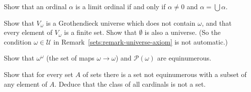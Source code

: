 \begin{exercise}\label{sets:exercise-limit-ordinal}
Show that an ordinal $\alpha$ is a limit ordinal if and only if
$\alpha \neq 0$ and $\alpha = \bigcup \alpha$.
\end{exercise}

\begin{exercise}\label{sets:exercise-hereditarily-finite}
Show that $V_\omega$ is a Grothendieck universe which does not contain
$\omega$, and that every element of $V_\omega$ is a finite set. Show that
$\emptyset$ is also a universe. (So the condition $\omega \in \mathcal{U}$ in
Remark~\ref{sets:remark-universe-axiom} is not automatic.)
\end{exercise}

\begin{exercise}\label{sets:exercise-real-cardinality}
Show that $\omega^\omega$ (the set of maps $\omega \to \omega$) and
$\mathcal{P}(\omega)$ are equinumerous.
\end{exercise}

\begin{exercise}\label{sets:exercise-no-set-of-cardinalities}
Show that for every set $A$ of sets there is a set not equinumerous with a
subset of any element of $A$. Deduce that the class of all cardinals is not a
set.
\end{exercise}
